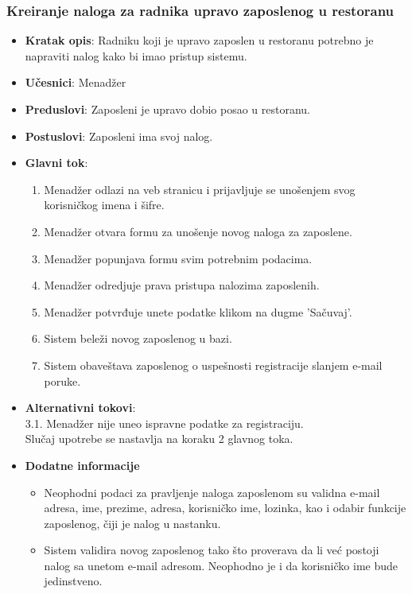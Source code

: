  \subsubsection{Kreiranje naloga za radnika upravo zaposlenog u restoranu}
 
\begin{itemize}
    \item \textbf{Kratak opis}:
   Radniku koji je upravo zaposlen u restoranu potrebno je napraviti nalog kako bi imao pristup sistemu.
    \item \textbf{Učesnici}:
    Menadžer
    \item \textbf{Preduslovi}:
    Zaposleni je upravo dobio posao u restoranu.
    \item \textbf{Postuslovi}:
    Zaposleni ima svoj nalog. 
    \item \textbf{Glavni tok}:
   \begin{enumerate}
        \item Menadžer odlazi na veb stranicu i prijavljuje se unošenjem svog korisničkog imena i šifre.
        \item Menadžer otvara formu za unošenje novog naloga za zaposlene.
        \item Menadžer popunjava formu svim potrebnim podacima.
        \item Menadžer odredjuje prava pristupa nalozima zaposlenih.
        \item Menadžer potvrđuje unete podatke klikom na dugme 'Sačuvaj'.
        \item Sistem beleži novog zaposlenog u bazi.
        \item Sistem obaveštava zaposlenog o uspešnosti registracije slanjem e-mail poruke.
\end{enumerate}
\end{itemize}
\begin {itemize}
\item \textbf {Alternativni tokovi}:\\
 3.1. Menadžer nije uneo ispravne podatke za registraciju.\\
 Slučaj upotrebe se nastavlja na koraku 2 glavnog toka.
 \end{itemize}
 \begin{itemize} 
     \item \textbf{Dodatne informacije}
 \begin{itemize}
     \item Neophodni podaci za pravljenje naloga zaposlenom su validna e-mail adresa, ime, prezime, adresa, korisničko ime, lozinka, kao i odabir funkcije zaposlenog, čiji je nalog u nastanku.
    \item Sistem validira novog zaposlenog tako što proverava da li već postoji nalog sa unetom e-mail adresom. Neophodno je i da korisničko ime bude jedinstveno.
 \end{itemize}
 \end{itemize}

